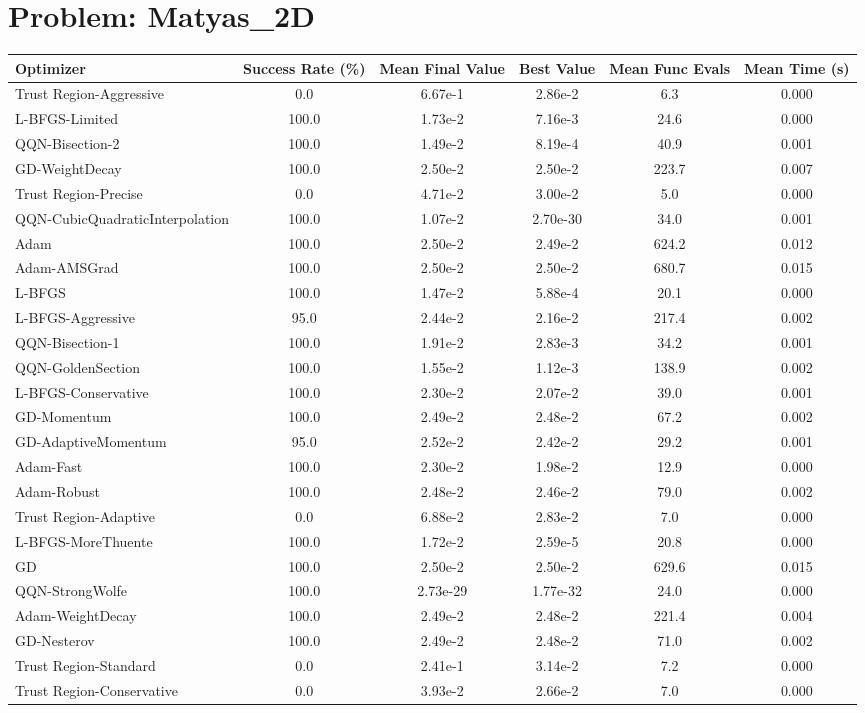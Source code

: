 \documentclass{article}
\begin{document}
\section{Problem: Matyas\_2D}
\begin{longtable}{p{3cm}*{5}{c}}
\toprule
\textbf{Optimizer} & \textbf{Success Rate (\%)} & \textbf{Mean Final Value} & \textbf{Best Value} & \textbf{Mean Func Evals} & \textbf{Mean Time (s)} \\
\midrule
Trust Region-Aggressive & 0.0 & 6.67e-1 & 2.86e-2 & 6.3 & 0.000 \\
L-BFGS-Limited & 100.0 & 1.73e-2 & 7.16e-3 & 24.6 & 0.000 \\
QQN-Bisection-2 & 100.0 & 1.49e-2 & 8.19e-4 & 40.9 & 0.001 \\
GD-WeightDecay & 100.0 & 2.50e-2 & 2.50e-2 & 223.7 & 0.007 \\
Trust Region-Precise & 0.0 & 4.71e-2 & 3.00e-2 & 5.0 & 0.000 \\
QQN-CubicQuadraticInterpolation & 100.0 & 1.07e-2 & 2.70e-30 & 34.0 & 0.001 \\
Adam & 100.0 & 2.50e-2 & 2.49e-2 & 624.2 & 0.012 \\
Adam-AMSGrad & 100.0 & 2.50e-2 & 2.50e-2 & 680.7 & 0.015 \\
L-BFGS & 100.0 & 1.47e-2 & 5.88e-4 & 20.1 & 0.000 \\
L-BFGS-Aggressive & 95.0 & 2.44e-2 & 2.16e-2 & 217.4 & 0.002 \\
QQN-Bisection-1 & 100.0 & 1.91e-2 & 2.83e-3 & 34.2 & 0.001 \\
QQN-GoldenSection & 100.0 & 1.55e-2 & 1.12e-3 & 138.9 & 0.002 \\
L-BFGS-Conservative & 100.0 & 2.30e-2 & 2.07e-2 & 39.0 & 0.001 \\
GD-Momentum & 100.0 & 2.49e-2 & 2.48e-2 & 67.2 & 0.002 \\
GD-AdaptiveMomentum & 95.0 & 2.52e-2 & 2.42e-2 & 29.2 & 0.001 \\
Adam-Fast & 100.0 & 2.30e-2 & 1.98e-2 & 12.9 & 0.000 \\
Adam-Robust & 100.0 & 2.48e-2 & 2.46e-2 & 79.0 & 0.002 \\
Trust Region-Adaptive & 0.0 & 6.88e-2 & 2.83e-2 & 7.0 & 0.000 \\
L-BFGS-MoreThuente & 100.0 & 1.72e-2 & 2.59e-5 & 20.8 & 0.000 \\
GD & 100.0 & 2.50e-2 & 2.50e-2 & 629.6 & 0.015 \\
QQN-StrongWolfe & 100.0 & 2.73e-29 & 1.77e-32 & 24.0 & 0.000 \\
Adam-WeightDecay & 100.0 & 2.49e-2 & 2.48e-2 & 221.4 & 0.004 \\
GD-Nesterov & 100.0 & 2.49e-2 & 2.48e-2 & 71.0 & 0.002 \\
Trust Region-Standard & 0.0 & 2.41e-1 & 3.14e-2 & 7.2 & 0.000 \\
Trust Region-Conservative & 0.0 & 3.93e-2 & 2.66e-2 & 7.0 & 0.000 \\
\bottomrule
\end{longtable}
\end{document}
